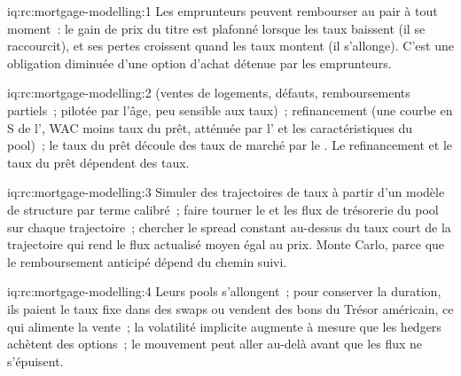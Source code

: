 \begin{solution}{iq:rc:mortgage-modelling:1}
Les emprunteurs peuvent rembourser au pair à tout moment~: le gain de prix du titre est plafonné lorsque
les taux baissent (il se raccourcit), et ses pertes croissent quand les taux montent (il s'allonge). C'est une obligation
diminuée d'une option d'achat détenue par les emprunteurs.
\end{solution}

\begin{solution}{iq:rc:mortgage-modelling:2}
 (ventes de logements, défauts, remboursements partiels~; pilotée par l'âge, peu sensible aux taux)~;
refinancement (une courbe en S de l', WAC moins taux du prêt, atténuée par l'
et les caractéristiques du pool)~; le taux du prêt découle des taux de marché par le
. Le refinancement et le taux du prêt dépendent des taux.
\end{solution}

\begin{solution}{iq:rc:mortgage-modelling:3}
Simuler des trajectoires de taux à partir d'un modèle de structure par terme calibré~; faire tourner le  et
les flux de trésorerie du pool sur chaque trajectoire~; chercher le spread constant au-dessus du taux court
de la trajectoire qui rend le flux actualisé moyen égal au prix. Monte Carlo, parce que
le remboursement anticipé dépend du chemin suivi.
\end{solution}

\begin{solution}{iq:rc:mortgage-modelling:4}
Leurs pools s'allongent~; pour conserver la duration, ils paient le taux fixe dans des swaps ou vendent des bons du Trésor américain, ce qui alimente
la vente~; la volatilité implicite augmente à mesure que les hedgers achètent des options~; le mouvement peut aller au-delà
avant que les flux ne s'épuisent.
\end{solution}

